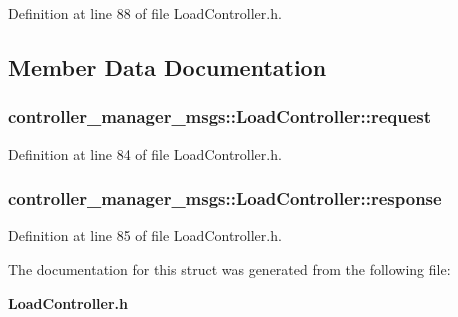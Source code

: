 \-Definition at line 88 of file \-Load\-Controller.\-h.



\subsection{\-Member \-Data \-Documentation}
\subsubsection[{request}]{ {\bf controller\-\_\-manager\-\_\-msgs\-::\-Load\-Controller\-::request}}\label{structcontroller__manager__msgs_1_1LoadController_a857baa2ed8faca874034e326cdf1c51d}


\-Definition at line 84 of file \-Load\-Controller.\-h.

\subsubsection[{response}]{ {\bf controller\-\_\-manager\-\_\-msgs\-::\-Load\-Controller\-::response}}\label{structcontroller__manager__msgs_1_1LoadController_a4c9b1bf609023a755fef4fa24b7cbd23}


\-Definition at line 85 of file \-Load\-Controller.\-h.



\-The documentation for this struct was generated from the following file\-:\begin{DoxyCompactItemize}
\item 
{\bf \-Load\-Controller.\-h}\end{DoxyCompactItemize}
